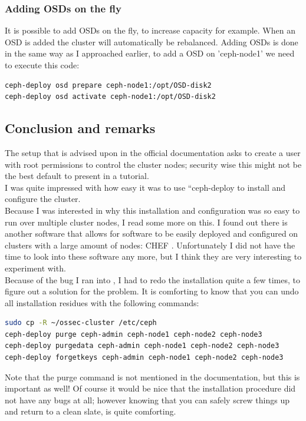 \documentclass[12pt]{report}
\begin{document}
\subsubsection{Adding OSDs on the fly}
It is possible to add OSDs on the fly, to increase capacity for
example. When an OSD is added the cluster will automatically be
rebalanced.
Adding OSDs is done in the same way as I approached earlier,
to add a OSD on 'ceph-node1' we need to execute this code:
\begin{lstlisting}[language=bash]
ceph-deploy osd prepare ceph-node1:/opt/OSD-disk2
ceph-deploy osd activate ceph-node1:/opt/OSD-disk2
\end{lstlisting}

\subsection{Conclusion and remarks}
The setup that is advised upon in the official documentation asks to
create a user with root permissions to control the cluster nodes;
security wise this might not be the best default to present in a tutorial.\\
I was quite impressed with how easy it was to use ``ceph-deploy
to install and configure the cluster. \\
Because I was interested in why
this installation and configuration was so easy to run over multiple
cluster nodes, I read some more on this. I found out there
is another software that allows for software to be easily deployed and
configured on clusters with a large amount of nodes: CHEF
\cite{chef_soft}. Unfortunately I
did not have the time to look into these software any more, but I
think they are very interesting to experiment with.\\
Because of the bug I ran into \cite{ceph_bug_1}, I had to redo the
installation quite a few times, to figure out a solution for the
problem.
It is comforting to know that you can undo all installation residues with the
following commands:
\begin{lstlisting}[language=bash]
sudo cp -R ~/ossec-cluster /etc/ceph
ceph-deploy purge ceph-admin ceph-node1 ceph-node2 ceph-node3
ceph-deploy purgedata ceph-admin ceph-node1 ceph-node2 ceph-node3
ceph-deploy forgetkeys ceph-admin ceph-node1 ceph-node2 ceph-node3
\end{lstlisting}
Note that the purge command is not mentioned in the documentation, but
this is important as well!
Of course it would be nice that the installation procedure did not have any bugs
at all; however knowing that you can safely screw things up and return to a
clean slate, is quite comforting.\\
\end{document}
